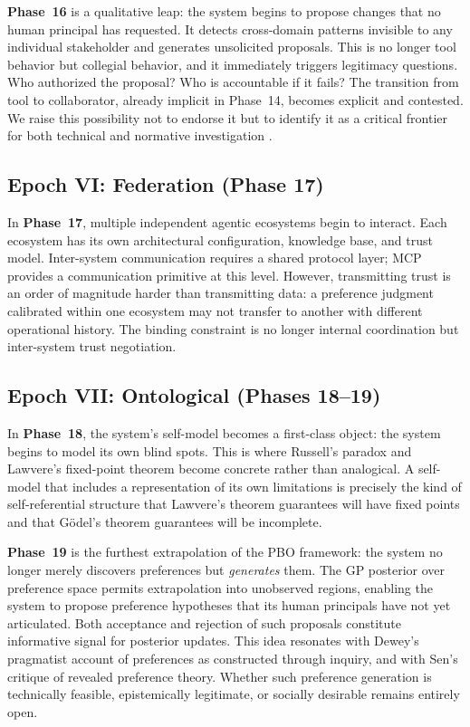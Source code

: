 \textbf{Phase~16} is a qualitative leap: the system begins to propose changes that no human principal has requested. It detects cross-domain patterns invisible to any individual stakeholder and generates unsolicited proposals. This is no longer tool behavior but collegial behavior, and it immediately triggers legitimacy questions. Who authorized the proposal? Who is accountable if it fails? The transition from tool to collaborator, already implicit in Phase~14, becomes explicit and contested. We raise this possibility not to endorse it but to identify it as a critical frontier for both technical and normative investigation \cite{gabriel2020}.

\subsection{Epoch VI: Federation (Phase 17)}

In \textbf{Phase~17}, multiple independent agentic ecosystems begin to interact. Each ecosystem has its own architectural configuration, knowledge base, and trust model. Inter-system communication requires a shared protocol layer; MCP \cite{anthropic2024mcp} provides a communication primitive at this level. However, transmitting trust is an order of magnitude harder than transmitting data: a preference judgment calibrated within one ecosystem may not transfer to another with different operational history. The binding constraint is no longer internal coordination but inter-system trust negotiation.

\subsection{Epoch VII: Ontological (Phases 18--19)}

In \textbf{Phase~18}, the system's self-model becomes a first-class object: the system begins to model its own blind spots. This is where Russell's paradox and Lawvere's fixed-point theorem \cite{lawvere1969} become concrete rather than analogical. A self-model that includes a representation of its own limitations is precisely the kind of self-referential structure that Lawvere's theorem guarantees will have fixed points and that G\"odel's theorem \cite{godel1931} guarantees will be incomplete.

\textbf{Phase~19} is the furthest extrapolation of the PBO framework: the system no longer merely discovers preferences but \emph{generates} them. The GP posterior over preference space permits extrapolation into unobserved regions, enabling the system to propose preference hypotheses that its human principals have not yet articulated. Both acceptance and rejection of such proposals constitute informative signal for posterior updates. This idea resonates with Dewey's \cite{dewey1939} pragmatist account of preferences as constructed through inquiry, and with Sen's \cite{sen1977} critique of revealed preference theory. Whether such preference generation is technically feasible, epistemically legitimate, or socially desirable remains entirely open.

